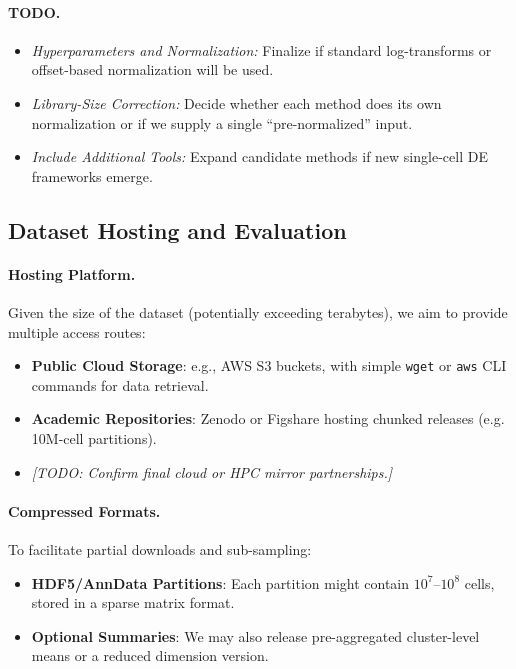 \documentclass{article}
\begin{document}
\paragraph{TODO.}
\begin{itemize}
	\item \emph{Hyperparameters and Normalization:} Finalize if standard log-transforms or offset-based normalization will be used. 
	\item \emph{Library-Size Correction:} Decide whether each method does its own normalization or if we supply a single “pre-normalized” input.
	\item \emph{Include Additional Tools:} Expand candidate methods if new single-cell DE frameworks emerge.
\end{itemize}


\subsection{Dataset Hosting and Evaluation}
\label{subsec:dataset_hosting}

\paragraph{Hosting Platform.}
Given the size of the dataset (potentially exceeding terabytes), we aim to provide multiple access routes:
\begin{itemize}
	\item \textbf{Public Cloud Storage}: e.g., AWS S3 buckets, with simple \texttt{wget} or \texttt{aws} CLI commands for data retrieval.
	\item \textbf{Academic Repositories}: Zenodo or Figshare hosting chunked releases (e.g. 10M-cell partitions).
	\item \textit{[TODO: Confirm final cloud or HPC mirror partnerships.]}
\end{itemize}

\paragraph{Compressed Formats.}
To facilitate partial downloads and sub-sampling:
\begin{itemize}
	\item \textbf{HDF5/AnnData Partitions}: Each partition might contain $10^7$--$10^8$ cells, stored in a sparse matrix format.
	\item \textbf{Optional Summaries}: We may also release pre-aggregated cluster-level means or a reduced dimension version.
\end{itemize}
\end{document}
